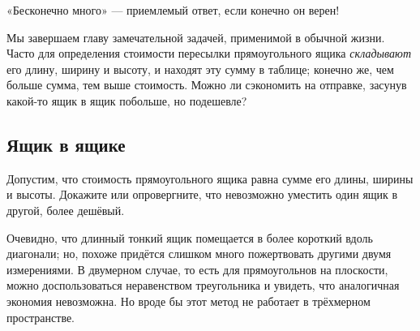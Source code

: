  «Бесконечно много» --- приемлемый ответ, если конечно он верен!

\medskip

Мы завершаем главу замечательной задачей, применимой в обычной жизни.
Часто для определения стоимости пересылки прямоугольного ящика \emph{складывают} его длину, ширину и высоту,
и находят эту сумму в таблице;
конечно же, чем больше сумма, тем выше стоимость.
Можно ли сэкономить на отправке, засунув какой-то ящик в ящик побольше, но подешевле?

\subsection*{Ящик в ящике}\label{Ящик в ящике}


Допустим, что стоимость прямоугольного ящика равна сумме его длины, ширины и высоты.
Докажите или опровергните, что невозможно уместить один ящик в другой, более дешёвый.

Очевидно, что длинный тонкий ящик помещается в более короткий вдоль диагонали;
но, похоже придётся слишком много пожертвовать другими двумя измерениями.
В двумерном случае, то есть для прямоугольнов на плоскости, можно доспользоваться неравенством треугольника и увидеть, что аналогичная экономия невозможна.
Но вроде бы этот метод не работает в трёхмерном пространстве.
